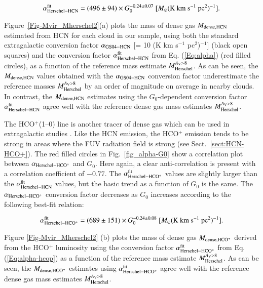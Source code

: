 \documentclass{aa}
\begin{document}
{\begin{equation}\label{Eq:alpha}
\alpha_{\rm Herschel-HCN}^{\rm fit} = (496\pm94) \times G_{\rm 0}^{-0.24\pm0.07} \ [M_{\odot} {\rm (K\ km\ s^{-1}\ pc^{2})^{-1}]}.
\end{equation}


Figure~\ref{Fig-Mvir_Mherschel2}(a) plots the mass of dense gas $M_{\rm dense,HCN}$ estimated from HCN for each cloud in our sample,
using both the standard extragalactic conversion factor $\alpha_{\rm GS04-HCN}$ [= 10 (K km s$^{-1}$ pc$^2$)$^{-1}$]  (black open squares)
and the conversion factor $\alpha_{\rm Herschel-HCN}^{\rm fit}$ from Eq. (\ref{Eq:alpha}) (red filled circles), 
as a function of the reference mass estimate $M_{\rm Herschel}^{A_{\rm V}>8}$. 
As can be seen, the $M_{\rm dense,HCN}$ values obtained with the $\alpha_{\rm GS04-HCN}$ conversion factor 
underestimate the reference masses $M_{\rm Herschel}^{A_{\rm V}>8}$ by an order of magnitude on average 
in nearby clouds. In contrast, the $M_{\rm dense,HCN}$ estimates using the $G_0$-dependent conversion factor 
$\alpha_{\rm Herschel-HCN}^{\rm fit}$ agree well with the reference dense gas mass estimates $M_{\rm Herschel}^{A_{\rm V}>8}$.


The HCO$^{+}$(1--0) line is another tracer of dense gas which can be used in extragalactic studies \citep[][]{Brain16}. 
Like the HCN emission, the HCO$^{+}$ emission tends to be strong in areas where the FUV radiation field is strong (see  Sect.~\ref{sect:HCN-HCO+}).
The red filled circles in Fig.~\ref{fig_alpha-G0} show a correlation plot between $\alpha_{\rm Herschel-HCO^+}$ and $G_0$. 
Here again, a clear anti-correlation is present with a correlation coefficient of $-0.77$. 
The $\alpha_{\rm Herschel-HCO^+}^{\rm fit}$ values are slightly larger than the $\alpha_{\rm Herschel-HCN}^{\rm fit}$ values, but 
the basic trend as a function of $G_{0}$ is the same. 
The $\alpha_{\rm Herschel-HCO^+}$ conversion factor decreases as $G_{0}$ increases according to the following best-fit relation:



\begin{equation}\label{Eq:alpha-hcop}
\alpha_{\rm Herschel-HCO^+}^{\rm fit} = (689\pm151) \times G_{0}^{-0.24\pm0.08} \ [M_{\odot} {\rm (K\ km\ s^{-1}\ pc^{2})^{-1}]}.
\end{equation}


\noindent 
Figure \ref{Fig-Mvir_Mherschel2} (b) plots the mass of dense gas $M_{\rm dense,HCO^+}$ derived from the HCO$^+$ luminosity 
using the conversion factor $\alpha_{\rm Herschel-HCO^+}^{\rm fit}$ from Eq. (\ref{Eq:alpha-hcop}) 
as a function of the reference mass estimate $M_{\rm Herschel}^{A_{\rm V}>8}$. 
As can be seen, the $M_{\rm dense,HCO^+}$ estimates using 
$\alpha_{\rm Herschel-HCO^+}^{\rm fit}$ 
agree well with the reference dense gas mass estimates $M_{\rm Herschel}^{A_{\rm V}>8}$.



}
\end{document}
